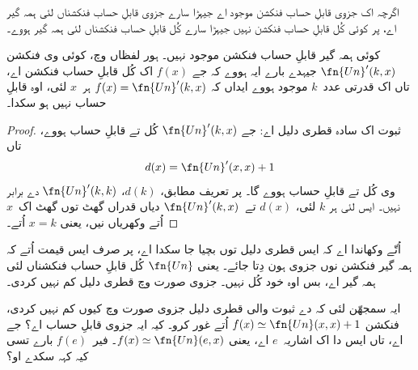 \documentclass[../../../include/open-logic-section]{subfiles}
\begin{document}

اگرچہ اک جزوی قابلِ حساب فنکشن موجود اے جیہڑا سارے جزوی
قابلِ حساب فنکشناں لئی ہمہ گیر اے، پر کوئی کُل قابلِ حساب
فنکشن نہیں جیہڑا سارے کُل قابلِ حساب فنکشناں لئی ہمہ گیر ہووے۔

\begin{thm}
کوئی ہمہ گیر قابلِ حساب فنکشن موجود نہیں۔ ہور لفظاں وچ،
کوئی وی فنکشن $\fn{Un}'(k, x)$ جیہدے بارے ایہ ہووے کہ جے
$f(x)$ اک کُل قابلِ حساب فنکشن اے، تاں اک قدرتی عدد~$k$
موجود ہووے ایداں کہ $f(x) = \fn{Un}'(k,x)$ ہر~$x$ لئی،
اوہ قابلِ حساب نہیں ہو سکدا۔
\end{thm}

\begin{proof}
ثبوت اک سادہ قطری دلیل اے: جے $\fn{Un}'(k,x)$ کُل تے
قابلِ حساب ہووے، تاں
\[
d(x) = \fn{Un}'(x, x) + 1
\]
وی کُل تے قابلِ حساب ہووے گا۔ پر تعریف مطابق، $d(k)$،
$\fn{Un}'(k,k)$ دے برابر نہیں۔ ایس لئی ہر $k$ لئی،
$d(x)$ تے~$\fn{Un}'(k, x)$ دیاں قدراں گھٹ توں گھٹ
اک~$x$ اُتے وکھریاں نیں، یعنی $x = k$ اُتے۔
\end{proof}

\begin{explain}
اُتّے  وکھاندا اے کہ ایس قطری
دلیل توں بچیا جا سکدا اے، پر صرف ایس قیمت اُتے کہ
ہمہ گیر فنکشن نوں جزوی ہون دِتا جائے۔ یعنی $\fn{Un}$
کُل قابلِ حساب فنکشناں لئی ہمہ گیر اے، بس اوہ خود کُل
نہیں۔ جزوی صورت وچ قطری دلیل کم نہیں کردی۔
\end{explain}

\begin{prob}
  ایہ سمجھّن لئی کہ  دے ثبوت والی
  قطری دلیل جزوی صورت وچ کیوں کم نہیں کردی، فنکشن
  $f(x) \simeq \fn{Un}(x,x)+1$ اُتے غور کرو۔ کیہ ایہ
  جزوی قابلِ حساب اے؟ جے اے، تاں ایس دا اک اشاریہ~$e$
  اے، یعنی $f(x) \simeq \fn{Un}(e,x)$۔ فیر~$f(e)$
  بارے تسی کیہ کہہ سکدے او؟
\end{prob}
\end{document}
